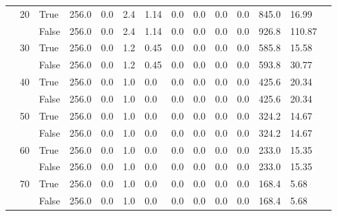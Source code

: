 \begin{appendices}
\begin{landscape}
\begin{small}
\begin{longtable}[c]{@{}lll|ll|ll|ll|ll|lll@{}}
   & 20 & True  & 256.0           & 0.0            & 2.4           & 1.14          & 0.0           & 0.0           & 0.0           & 0.0           & 845.0         & 16.99       &  \\
   &    & False & 256.0           & 0.0            & 2.4           & 1.14          & 0.0           & 0.0           & 0.0           & 0.0           & 926.8         & 110.87      &  \\
   & 30 & True  & 256.0           & 0.0            & 1.2           & 0.45          & 0.0           & 0.0           & 0.0           & 0.0           & 585.8         & 15.58       &  \\
   &    & False & 256.0           & 0.0            & 1.2           & 0.45          & 0.0           & 0.0           & 0.0           & 0.0           & 593.8         & 30.77       &  \\
   & 40 & True  & 256.0           & 0.0            & 1.0           & 0.0           & 0.0           & 0.0           & 0.0           & 0.0           & 425.6         & 20.34       &  \\
   &    & False & 256.0           & 0.0            & 1.0           & 0.0           & 0.0           & 0.0           & 0.0           & 0.0           & 425.6         & 20.34       &  \\
   & 50 & True  & 256.0           & 0.0            & 1.0           & 0.0           & 0.0           & 0.0           & 0.0           & 0.0           & 324.2         & 14.67       &  \\
   &    & False & 256.0           & 0.0            & 1.0           & 0.0           & 0.0           & 0.0           & 0.0           & 0.0           & 324.2         & 14.67       &  \\
   & 60 & True  & 256.0           & 0.0            & 1.0           & 0.0           & 0.0           & 0.0           & 0.0           & 0.0           & 233.0         & 15.35       &  \\
   &    & False & 256.0           & 0.0            & 1.0           & 0.0           & 0.0           & 0.0           & 0.0           & 0.0           & 233.0         & 15.35       &  \\
   & 70 & True  & 256.0           & 0.0            & 1.0           & 0.0           & 0.0           & 0.0           & 0.0           & 0.0           & 168.4         & 5.68        &  \\
   &    & False & 256.0           & 0.0            & 1.0           & 0.0           & 0.0           & 0.0           & 0.0           & 0.0           & 168.4         & 5.68        &  \\

\end{longtable}
\end{small}
\end{landscape}
\end{appendices}
